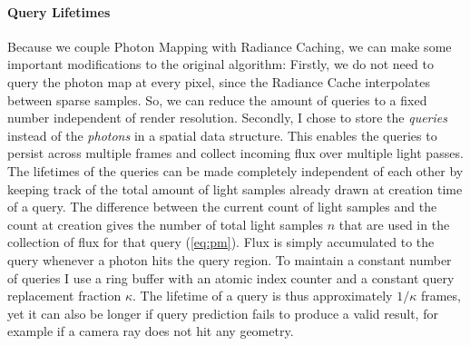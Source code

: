 \paragraph{Query Lifetimes}
Because we couple Photon Mapping with Radiance Caching, we can make some important modifications to the original algorithm:
Firstly, we do not need to query the photon map at every pixel, since the Radiance Cache interpolates between sparse samples.
So, we can reduce the amount of queries to a fixed number independent of render resolution.
Secondly, I chose to store the \emph{queries} instead of the \emph{photons} in a spatial data structure.
This enables the queries to persist across multiple frames and collect incoming flux over multiple light passes.
The lifetimes of the queries can be made completely independent of each other by keeping track of the total amount of light samples already drawn at creation time of a query.
The difference between the current count of light samples and the count at creation gives the number of total light samples $n$ that are used in the collection of flux for that query (\autoref{eq:pm}).
Flux is simply accumulated to the query whenever a photon hits the query region.
To maintain a constant number of queries I use a ring buffer with an atomic index counter and a constant query replacement fraction $\kappa$.
The lifetime of a query is thus approximately $1/\kappa$ frames, yet it can also be longer if query prediction fails to produce a valid result, for example if a camera ray does not hit any geometry.

